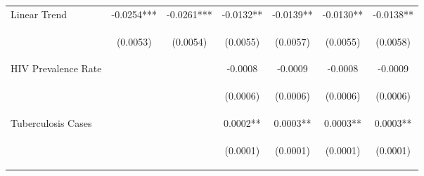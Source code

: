 \documentclass{article}
\begin{document}
\begin{table}[htbp]
{\begin{tabular}{lcccccc}
Linear Trend & -0.0254*** & -0.0261*** & -0.0132** & -0.0139** & -0.0130** & -0.0138** \\
\vspace{4pt} & \begin{footnotesize}(0.0053)\end{footnotesize} & \begin{footnotesize}(0.0054)\end{footnotesize} & \begin{footnotesize}(0.0055)\end{footnotesize} & \begin{footnotesize}(0.0057)\end{footnotesize} & \begin{footnotesize}(0.0055)\end{footnotesize} & \begin{footnotesize}(0.0058)\end{footnotesize} \\
HIV Prevalence Rate &  &  & -0.0008 & -0.0009 & -0.0008 & -0.0009 \\
\vspace{4pt} & \begin{footnotesize}\end{footnotesize} & \begin{footnotesize}\end{footnotesize} & \begin{footnotesize}(0.0006)\end{footnotesize} & \begin{footnotesize}(0.0006)\end{footnotesize} & \begin{footnotesize}(0.0006)\end{footnotesize} & \begin{footnotesize}(0.0006)\end{footnotesize} \\
Tuberculosis Cases &  &  & 0.0002** & 0.0003** & 0.0003** & 0.0003** \\
\vspace{4pt} & \begin{footnotesize}\end{footnotesize} & \begin{footnotesize}\end{footnotesize} & \begin{footnotesize}(0.0001)\end{footnotesize} & \begin{footnotesize}(0.0001)\end{footnotesize} & \begin{footnotesize}(0.0001)\end{footnotesize} & \begin{footnotesize}(0.0001)\end{footnotesize} \\

\end{tabular}}
\end{table}
\end{document}
